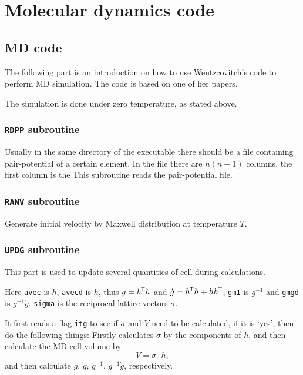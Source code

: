 
\section{Molecular dynamics code}

\subsection{MD code}

The following part is an introduction on how to use
Wentzcovitch's code to perform MD simulation. The code is
based on one of her papers.\cite{Wentzcovitch:1991ka}

The simulation is done under zero temperature, as stated above.


\subsubsection{\texttt{RDPP} subroutine}

Usually in the same directory of the executable there should be
a file containing pair-potential of a certain element. In the file there
are $n (n+1)$ columns, the first column is the
This subroutine reads the pair-potential file.


\subsubsection{\texttt{RANV} subroutine}

Generate initial velocity by Maxwell distribution at temperature $T$.


\subsubsection{\texttt{UPDG} subroutine}

This part is used to update several quantities of cell during calculations.

Here \texttt{avec} is $h$, \texttt{avecd} is $\dot{ h }$, thus $g = h^{\mkern-1.5mu\mathsf{T}} h$
and $\dot{g}  = \dot{ h }^{\mkern-1.5mu\mathsf{T}} h + h \dot{ h }^{\mkern-1.5mu\mathsf{T}}$, \texttt{gm1} is $g^{-1}$
and \texttt{gmgd} is $g^{-1} \dot{g}$. \texttt{sigma} is the reciprocal lattice
vectors $\sigma$.

It first reads a flag \texttt{itg} to see if $\sigma$ and $V$ need to be calculated,
if it is `yes', then do the following things:
Firstly calculates $\sigma$ by the components of $h$, and then calculate the
MD cell volume by
\begin{equation}
	V = \sigma \cdot h,
\end{equation}
and then calculate $g$, $\dot{ g }$, $g^{-1}$, $g^{-1}\dot{g}$, respectively.


